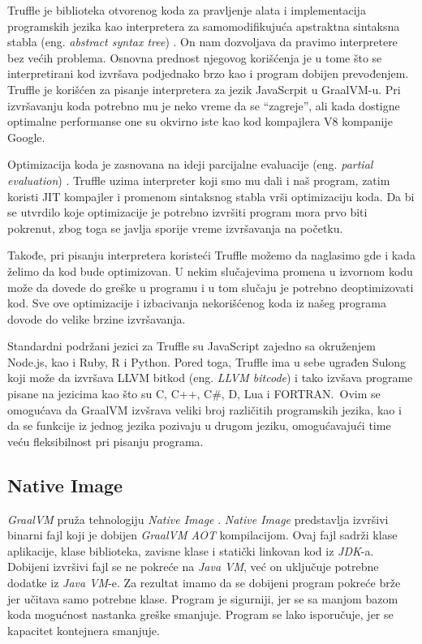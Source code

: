\documentclass[a4paper]{article}
\begin{document}
Truffle je biblioteka otvorenog koda za pravljenje alata i implementacija programskih jezika kao interpretera za samomodifikujuća apstraktna sintaksna stabla (eng. \emph{abstract syntax tree}) \cite{graalvm}. On nam dozvoljava da pravimo interpretere bez većih problema. Osnovna prednost njegovog korišćenja je u tome što se interpretirani kod izvršava podjednako brzo kao i program dobijen prevođenjem. Truffle je korišćen za pisanje interpretera za jezik JavaScrpit u GraalVM-u. Pri izvršavanju koda potrebno mu je neko vreme da se ``zagreje'', ali kada dostigne optimalne performanse one su okvirno iste kao kod kompajlera V8 kompanije Google.

Optimizacija koda je zasnovana na ideji parcijalne evaluacije (eng. \emph{partial evaluation}) \cite{whataboutgraalvm}. Truffle uzima interpreter koji smo mu dali i naš program, zatim koristi JIT kompajler i promenom sintaksnog stabla vrši optimizaciju koda. Da bi se utvrdilo koje optimizacije je potrebno izvršiti program mora prvo biti pokrenut, zbog toga se javlja sporije vreme izvršavanja na početku.

Takođe, pri pisanju interpretera koristeći Truffle možemo da naglasimo gde i kada želimo da kod bude optimizovan. U nekim slučajevima promena u izvornom kodu može da dovede do greške u programu i u tom slučaju je potrebno deoptimizovati kod. Sve ove optimizacije i izbacivanja nekorišćenog koda iz našeg programa dovode do velike brzine izvršavanja.

Standardni podržani jezici za Truffle su JavaScript zajedno sa okruženjem Node.js, kao i Ruby, R i Python. Pored toga, Truffle ima u sebe ugrađen Sulong koji može da izvršava LLVM bitkod (eng. \emph{LLVM bitcode}) i tako izvšava programe pisane na jezicima kao što su C, C++, C\#, D, Lua i FORTRAN.\ Ovim se omogućava da GraalVM izvšrava veliki broj različitih programskih jezika, kao i da se funkcije iz jednog jezika pozivaju u drugom jeziku, omogućavajući time veću fleksibilnost pri pisanju programa.

\subsection{Native Image}
\label{sub:cloud}

\emph{GraalVM} pruža tehnologiju \emph{Native Image} \cite{graalvm}. \emph{Native Image} predstavlja izvršivi binarni fajl koji je dobijen \emph{GraalVM AOT} kompilacijom. Ovaj fajl sadrži klase aplikacije, klase biblioteka, zavisne klase i statički linkovan kod iz \emph{JDK}-a. Dobijeni izvršivi fajl se ne pokreće na \emph{Java VM}, već on uključuje potrebne dodatke iz \emph{Java VM}-e. Za rezultat imamo da se dobijeni program pokreće brže jer učitava samo potrebne klase. Program je sigurniji, jer se sa manjom bazom koda mogućnost nastanka greške smanjuje.
 Program se lako isporučuje, jer se kapacitet kontejnera smanjuje. \\
\end{document}
